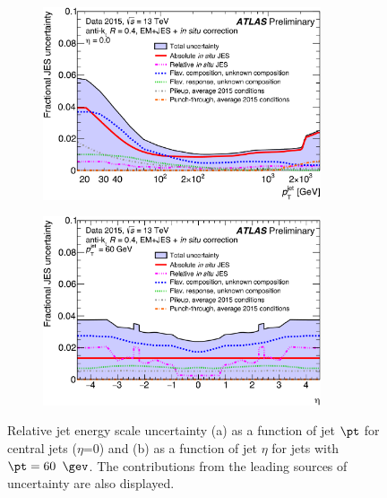 \begin{figure}[t!]
\begin{subfigure}{0.5\textwidth}
  \centering
  \includegraphics[width=0.9\textwidth]{figures/Objects/JESuncpt.png}
  \caption{}
  \label{fig:obj:jet:jesuncpt}
\end{subfigure}
\begin{subfigure}{0.5\textwidth}
  \centering
  \includegraphics[width=0.9\textwidth]{figures/Objects/JESunceta.png}
  \caption{}
  \label{fig:obj:jet:jesunceta}
\end{subfigure}

\captionsetup{width=0.85\textwidth} \caption{\small Relative jet energy scale uncertainty (a) as a function of jet $\pt$ for central jets ($\eta$=0) and (b) as a function of jet $\eta$ for jets with $\pt=60$ $\gev$. The contributions from the leading sources of uncertainty are also displayed.}
\label{fig:obj:jet:jesunc}
\end{figure}

